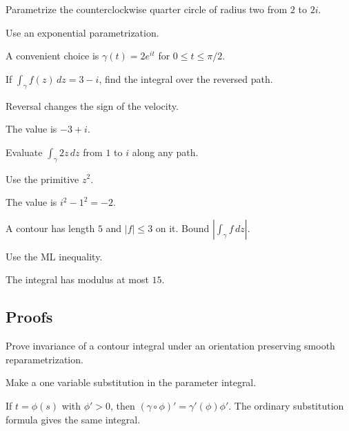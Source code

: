 \begin{exercise}\label{exr:iv04-expand-02}
Parametrize the counterclockwise quarter circle of radius two from \(2\) to \(2i\).
\end{exercise}
\begin{hint}
Use an exponential parametrization.
\end{hint}
\begin{solution}
A convenient choice is \(\gamma(t)=2e^{it}\) for \(0\le t\le\pi/2\).
\end{solution}

\begin{exercise}\label{exr:iv04-expand-03}
If \(\int_\gamma f(z)\,dz=3-i\), find the integral over the reversed path.
\end{exercise}
\begin{hint}
Reversal changes the sign of the velocity.
\end{hint}
\begin{solution}
The value is \(-3+i\).
\end{solution}

\begin{exercise}\label{exr:iv04-expand-04}
Evaluate \(\int_\gamma 2z\,dz\) from \(1\) to \(i\) along any path.
\end{exercise}
\begin{hint}
Use the primitive \(z^2\).
\end{hint}
\begin{solution}
The value is \(i^2-1^2=-2\).
\end{solution}

\begin{exercise}[ML bound]\label{exr:iv04-expand-05}
A contour has length \(5\) and \(|f|\le3\) on it. Bound \(|\int_\gamma f\,dz|\).
\end{exercise}
\begin{hint}
Use the ML inequality.
\end{hint}
\begin{solution}
The integral has modulus at most \(15\).
\end{solution}

\subsection*{Proofs}

\begin{exercise}[Reparametrization]\label{exr:iv04-expand-06}
Prove invariance of a contour integral under an orientation preserving smooth reparametrization.
\end{exercise}
\begin{hint}
Make a one variable substitution in the parameter integral.
\end{hint}
\begin{solution}
If \(t=\phi(s)\) with \(\phi'>0\), then \((\gamma\circ\phi)'=\gamma'(\phi)\phi'\). The ordinary substitution formula gives the same integral.
\end{solution}


